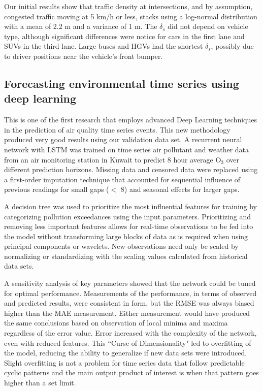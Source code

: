 Our initial results show that traffic density at intersections, and by assumption, congested traffic moving at 5 km/h or less, stacks using a log-normal distribution with a mean of 2.2 m and a variance of 1 m. The $\delta_{s}$ did not depend on vehicle type, although significant differences were notice for cars in the first lane and SUVs in the third lane. Large buses and HGVs had the shortest $\delta_{s}$, possibly due to driver positions near the vehicle's front bumper. 

\subsection{Forecasting environmental time series using deep learning}
This is one of the first research that employs advanced Deep Learning techniques in the prediction of air quality time series events. This new methodology produced very good results using our validation data set. A recurrent neural network with LSTM was trained on time series air pollutant and weather data from an air monitoring station in Kuwait to predict 8 hour average O$_{3}$ over different prediction horizons. Missing data and censored data were replaced using a first-order imputation technique that accounted for sequential influence of previous readings for small gaps ($<$ 8) and seasonal effects for larger gaps. 

A decision tree was used to prioritize the most influential features for training by categorizing pollution exceedances using the input parameters. Prioritizing and removing less important features allows for real-time observations to be fed into the model without transforming large blocks of data as is required when using principal components or wavelets. New observations need only be scaled by normalizing or standardizing with the scaling values calculated from historical data sets. 

A sensitivity analysis of key parameters showed that the network could be tuned for optimal performance. Measurements of the performance, in terms of observed and predicted results, were consistent in form, but the RMSE was always biased higher than the MAE measurement. Either measurement would have produced the same conclusions based on observation of local minima and maxima regardless of the error value. Error increased with the complexity of the network, even with reduced features. This ``Curse of Dimensionality" led to overfitting of the model, reducing the ability to generalize if new data sets were introduced. Slight overfitting is not a problem for time series data that follow predictable cyclic patterns and the main output product of interest is when that pattern goes higher than a set limit.

